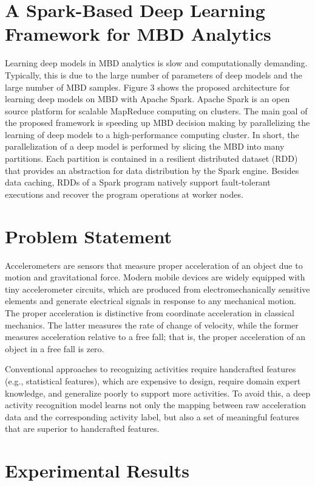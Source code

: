 \documentclass[14pt, a4paper]{extarticle}
\begin{document}
\section{A Spark-Based Deep Learning Framework for MBD Analytics}

Learning deep models in MBD analytics is slow and computationally demanding. Typically, this is due to the large number
of parameters of deep models and the large number of MBD
samples. Figure 3 shows the proposed architecture for learning
deep models on MBD with Apache Spark. Apache Spark
is an open source platform for scalable MapReduce computing on clusters. The main goal of the proposed framework is
speeding up MBD decision making by parallelizing the learning of deep models to a high-performance computing cluster.
In short, the parallelization of a deep model is performed
by slicing the MBD into many partitions. Each partition is
contained in a resilient distributed dataset (RDD) that provides an abstraction for data distribution by the Spark engine.
Besides data caching, RDDs of a Spark program natively support fault-tolerant executions and recover the program operations at worker nodes.


\section{Problem Statement}

Accelerometers are sensors that measure proper acceleration
of an object due to motion and gravitational force. Modern
mobile devices are widely equipped with tiny accelerometer
circuits, which are produced from electromechanically sensitive elements and generate electrical signals in response to any
mechanical motion. The proper acceleration is distinctive from
coordinate acceleration in classical mechanics. The latter measures the rate of change of velocity, while the former measures
acceleration relative to a free fall; that is, the proper acceleration of an object in a free fall is zero.

Conventional approaches to recognizing activities require
handcrafted features (e.g., statistical features), which are
expensive to design, require domain expert knowledge, and
generalize poorly to support more activities. To avoid this, a
deep activity recognition model learns not only the mapping
between raw acceleration data and the corresponding activity
label, but also a set of meaningful features that are superior to
handcrafted features.


\section{Experimental Results}
\end{document}
